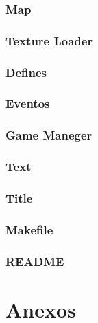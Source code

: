 \subsubsection{Map}

\subsubsection{Texture Loader}

\subsubsection{Defines}

\subsubsection{Eventos}

\subsubsection{Game Maneger}

\subsubsection{Text}

\subsubsection{Title}

\subsubsection{Makefile}

\subsubsection{README}\label{README}


\onecolumn
\section{Anexos}\label{anexo}

